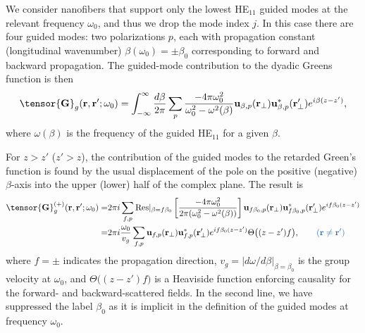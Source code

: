 \documentclass[preprint,aps,pra,onecolumn]{revtex4-1} %
\newcommand{\change}[1]{{\color{RoyalBlue} #1}}
\newcommand{\error}[1]{{\color{red} #1}}
\begin{document}
We consider nanofibers that support only the lowest HE$_{11}$ guided modes \cite{Yariv} at the relevant frequency $\omega_0$, and thus we drop the mode index $j$.  In this case there are four guided modes: two polarizations $p$, each with propagation constant (longitudinal wavenumber) $\beta(\omega_0) = \pm\beta_0$ corresponding to forward and backward propagation.  
The guided-mode contribution to the dyadic Greens function is then 
	\begin{equation} \label{Eq::GreensEigenmodes}
		\tensor{\mathbf{G}}_g(\br,\br'; \omega_0) = \int_{-\infty}^\infty \frac{d \beta}{2 \pi} \sum_{p} 
\frac{-4\pi\omega_0^2}{\omega_0^2-\omega^2(\beta)} \mathbf{u}_{\beta,p} (\br_\perp)\mathbf{u}^*_{\beta,p} 
(\br_{\perp}^\prime) e^{i\beta(z-z')},
	\end{equation}
where $ \omega(\beta)$ is the frequency of the guided HE$_{11}$ for a given $\beta$.  

For $z>z'$ ($z'>z$), the contribution of the guided modes to the retarded Green's function is found by the 
usual displacement of the pole on the positive (negative) $\beta$-axis into the upper (lower) half of 
the complex plane. The result is \cite{manga_rao_single_2007}
	\begin{align} 
		\tensor{\mathbf{G}}^{(+)}_g(\br,\br'; \omega_0) = &2\pi i \sum_{f,p}  {\rm Res}\vert_{\beta =f\beta_0} 
\left[\frac{-4\pi \omega_0^2 }{2\pi ( \omega_0^2-\omega^2(\beta))}\right]  \mathbf{u}_{f\beta_0, p} 
(\br_\perp)\mathbf{u}^*_{f\beta_0, p} (\br_{\perp}^\prime)e^{if \beta_0 (z-z')} \nonumber \\
= & 2\pi i \frac{\omega_0}{v_g } \sum_{f,p} \mathbf{u}_{f, p} (\br_\perp)\mathbf{u}^*_{f , p} 
(\br_{\perp}^\prime) e^{i f \beta_0(z-z')} \Theta \big( (z-z')f \big), \quad \quad \change{(\mbf{r} \neq \mbf{r}')} \label{Eq::GreensGuided}
	\end{align}
where $f=\pm$ indicates the propagation direction, $v_g= \vert d\omega/d\beta \vert_{\beta=\beta_0}$ is the group velocity at $\omega_0$, and $\Theta \big( (z-z')f \big)$ is a Heaviside function enforcing causality for the forward- and backward-scattered fields. In the second line, we have suppressed the label $\beta_0$ as it is implicit in the definition of the guided modes at frequency $\omega_0$. 
\end{document}

